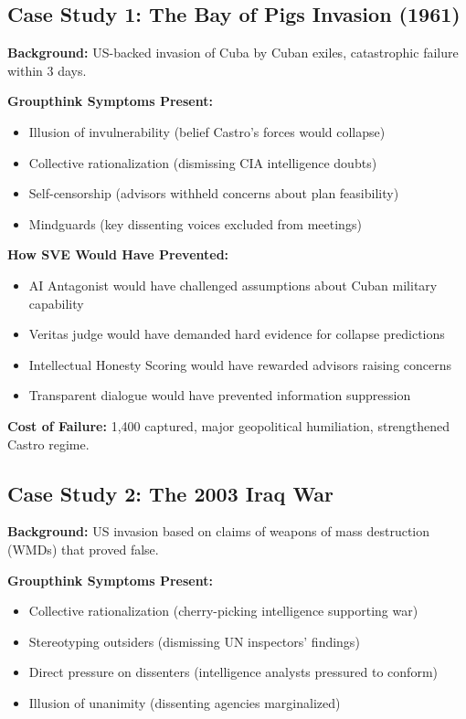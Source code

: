 \documentclass[11pt,a4paper]{article}
\begin{document}
\subsection*{Case Study 1: The Bay of Pigs Invasion (1961)}

\textbf{Background:} US-backed invasion of Cuba by Cuban exiles, catastrophic failure within 3 days.

\textbf{Groupthink Symptoms Present:}
\begin{itemize}[nosep]
    \item Illusion of invulnerability (belief Castro's forces would collapse)
    \item Collective rationalization (dismissing CIA intelligence doubts)
    \item Self-censorship (advisors withheld concerns about plan feasibility)
    \item Mindguards (key dissenting voices excluded from meetings)
\end{itemize}

\textbf{How SVE Would Have Prevented:}
\begin{itemize}[nosep]
    \item AI Antagonist would have challenged assumptions about Cuban military capability
    \item Veritas judge would have demanded hard evidence for collapse predictions
    \item Intellectual Honesty Scoring would have rewarded advisors raising concerns
    \item Transparent dialogue would have prevented information suppression
\end{itemize}

\textbf{Cost of Failure:} 1,400 captured, major geopolitical humiliation, strengthened Castro regime.

\subsection*{Case Study 2: The 2003 Iraq War}

\textbf{Background:} US invasion based on claims of weapons of mass destruction (WMDs) that proved false.

\textbf{Groupthink Symptoms Present:}
\begin{itemize}[nosep]
    \item Collective rationalization (cherry-picking intelligence supporting war)
    \item Stereotyping outsiders (dismissing UN inspectors' findings)
    \item Direct pressure on dissenters (intelligence analysts pressured to conform)
    \item Illusion of unanimity (dissenting agencies marginalized)
\end{itemize}
\end{document}
